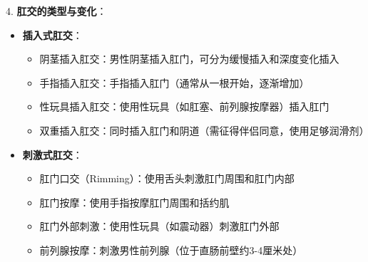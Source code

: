 \documentclass[12pt,UTF8]{ctexbook}
\begin{document}
4. \textbf{肛交的类型与变化}：
\begin{itemize}
	\item \textbf{插入式肛交}：
	\begin{itemize}
		\item 阴茎插入肛交：男性阴茎插入肛门，可分为缓慢插入和深度变化插入
		\item 手指插入肛交：手指插入肛门（通常从一根开始，逐渐增加）
		\item 性玩具插入肛交：使用性玩具（如肛塞、前列腺按摩器）插入肛门
		\item 双重插入肛交：同时插入肛门和阴道（需征得伴侣同意，使用足够润滑剂）
	\end{itemize}
	\item \textbf{刺激式肛交}：
	\begin{itemize}
		\item 肛门口交（Rimming）：使用舌头刺激肛门周围和肛门内部
		\item 肛门按摩：使用手指按摩肛门周围和括约肌
		\item 肛门外部刺激：使用性玩具（如震动器）刺激肛门外部
		\item 前列腺按摩：刺激男性前列腺（位于直肠前壁约3-4厘米处）
	\end{itemize}
\end{itemize}
\end{document}
